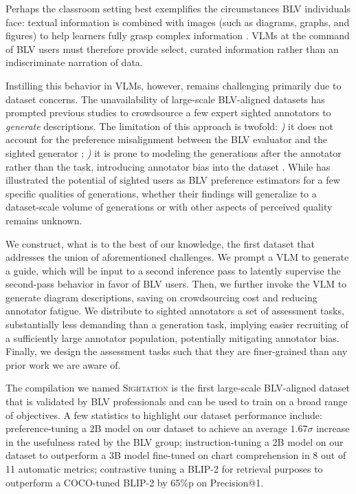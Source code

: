 Perhaps the classroom setting best exemplifies the circumstances BLV individuals face: textual information is combined with images (such as diagrams, graphs, and figures) to help learners fully grasp complex information \citep{vekiri2002value, cheng2009towards, tippett2016recent, gates2018importance}. VLMs at the command of BLV users must therefore provide select, curated information rather than an indiscriminate narration of data.

Instilling this behavior in VLMs, however, remains challenging primarily due to dataset concerns. The unavailability of large-scale BLV-aligned datasets has prompted previous studies to crowdsource a few expert sighted annotators to \textit{generate} descriptions. The limitation of this approach is twofold: \textit{)} it does not account for the preference misalignment between the BLV evaluator and the sighted generator \citep{9555469}; \textit{)} it is prone to modeling the generations after the annotator rather than the task, introducing annotator bias into the dataset \citep{geva2019we}.  While \citet{kreiss2022context} has illustrated the potential of sighted users as BLV preference estimators for a few specific qualities of generations, whether their findings will generalize to a dataset-scale volume of generations or with other aspects of perceived quality remains unknown. 

We construct, what is to the best of our knowledge, the first dataset that addresses the union of aforementioned challenges. We prompt a VLM to generate a guide, which will be input to a second inference pass to latently supervise the second-pass behavior in favor of BLV users. Then, we further invoke the VLM to generate diagram descriptions, saving on crowdsourcing cost and reducing annotator fatigue. We distribute to sighted annotators a set of assessment tasks, substantially less demanding than a generation task, implying easier recruiting of a sufficiently large annotator population, potentially mitigating annotator bias. Finally, we design the assessment tasks such that they are finer-grained than any prior work we are aware of.

The compilation we named \textsc{Sightation} is the first large-scale BLV-aligned dataset that is validated by BLV professionals and can be used to train on a broad range of objectives. A few statistics to highlight our dataset performance include: preference-tuning a 2B model on our dataset to achieve an average $1.67\sigma$ increase in the usefulness rated by the BLV group; instruction-tuning a 2B model on our dataset to outperform a 3B model fine-tuned on chart comprehension \citep{masry2024chartgemma} in 8 out of 11 automatic metrics; contrastive tuning a \textsc{BLIP-2}\citep{li2023blip} for retrieval purposes to outperform a COCO-tuned \textsc{BLIP-2} by 65\%p on Precision@1.

